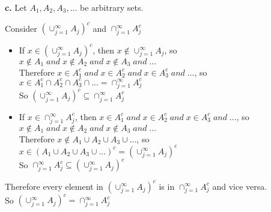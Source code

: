 \documentclass{article}
\begin{document}
\newpage
{\Large \textbf{c.}} Let $A_1, A_2, A_3, ...$ be arbitrary sets.
\begin{center}
    \doublespacing
    Consider $(\cup _{j=1}^{\infty} A_j)^c$ and $\cap _{j=1}^{\infty} A^c_j$
    \begin{itemize}
        \item If $x\in (\cup _{j=1}^{\infty} A_j)^c$, then $x\notin \cup _{j=1}^{\infty} A_j$, so $x\notin A_1 \;and\; x\notin A_2 \;and\; x\notin A_3 \;and\; ...$
        \\Therefore $x\in A^c_1 \;and\; x\in A^c_2 \;and\; x\in A^c_3 \;and\; ...$, so $x\in A^c_1\cap A^c_2\cap A^c_3\cap ... = \cap _{j=1}^{\infty} A^c_j$
        \\So $(\cup _{j=1}^{\infty} A_j)^c\subseteq \cap _{j=1}^{\infty} A^c_j$
        \item If $x\in \cap _{j=1}^{\infty} A_j^c$, then $x\in A^c_1 \;and\; x\in A^c_2 \;and\; x\in A^c_3 \;and\; ...$, so $x\notin A_1 \;and\; x\notin A_2 \;and\; x\notin A_3 \;and\; ...$
        \\Therefore $x\notin A_1\cup A_2\cup A_3\cup ...$, so $x\in (A_1\cup A_2\cup A_3\cup ...)^c = (\cup _{j=1}^{\infty} A_j)^c$
        \\So $\cap _{j=1}^{\infty} A_j^c\subseteq (\cup _{j=1}^{\infty} A_j)^c$
    \end{itemize}
    Therefore every element in $(\cup _{j=1}^{\infty} A_j)^c$ is in $\cap _{j=1}^{\infty} A^c_j$ and vice versa.
    \\So $(\cup _{j=1}^{\infty} A_j)^c = \cap _{j=1}^{\infty} A^c_j$ \qedsymbol
\end{center}
\end{document}
